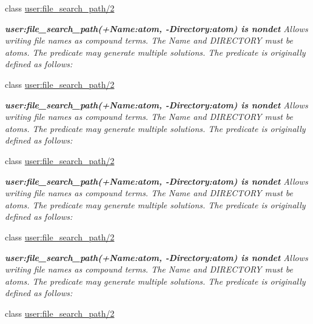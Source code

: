 \begin{DoxyCompactItemize}
class \hyperlink{classuser_1_1file__search__path_22}{user\+:file\+\_\+search\+\_\+path/2}
\begin{DoxyCompactList}\small\item\em {\bfseries  user\+:file\+\_\+search\+\_\+path(+\+Name\+:atom, -\/\+Directory\+:atom) is nondet } Allows writing file names as compound terms. The {\itshape Name} and {\itshape D\+I\+R\+E\+C\+T\+O\+RY} must be atoms. The predicate may generate multiple solutions. The predicate is originally defined as follows\+: \end{DoxyCompactList}\item 
class \hyperlink{classuser_1_1file__search__path_22}{user\+:file\+\_\+search\+\_\+path/2}
\begin{DoxyCompactList}\small\item\em {\bfseries  user\+:file\+\_\+search\+\_\+path(+\+Name\+:atom, -\/\+Directory\+:atom) is nondet } Allows writing file names as compound terms. The {\itshape Name} and {\itshape D\+I\+R\+E\+C\+T\+O\+RY} must be atoms. The predicate may generate multiple solutions. The predicate is originally defined as follows\+: \end{DoxyCompactList}\item 
class \hyperlink{classuser_1_1file__search__path_22}{user\+:file\+\_\+search\+\_\+path/2}
\begin{DoxyCompactList}\small\item\em {\bfseries  user\+:file\+\_\+search\+\_\+path(+\+Name\+:atom, -\/\+Directory\+:atom) is nondet } Allows writing file names as compound terms. The {\itshape Name} and {\itshape D\+I\+R\+E\+C\+T\+O\+RY} must be atoms. The predicate may generate multiple solutions. The predicate is originally defined as follows\+: \end{DoxyCompactList}\item 
class \hyperlink{classuser_1_1file__search__path_22}{user\+:file\+\_\+search\+\_\+path/2}
\begin{DoxyCompactList}\small\item\em {\bfseries  user\+:file\+\_\+search\+\_\+path(+\+Name\+:atom, -\/\+Directory\+:atom) is nondet } Allows writing file names as compound terms. The {\itshape Name} and {\itshape D\+I\+R\+E\+C\+T\+O\+RY} must be atoms. The predicate may generate multiple solutions. The predicate is originally defined as follows\+: \end{DoxyCompactList}\item 
class \hyperlink{classuser_1_1file__search__path_22}{user\+:file\+\_\+search\+\_\+path/2}

\end{DoxyCompactItemize}
